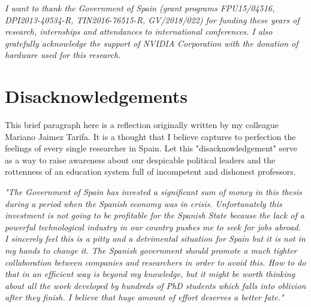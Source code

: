 \vfill

\emph{I want to thank the Government of Spain (grant programs FPU15/04516, DPI2013-40534-R, TIN2016-76515-R, GV/2018/022) for funding these years of research, internships and attendances to international conferences. I also gratefully acknowledge the support of NVIDIA Corporation with the donation of hardware used for this research.}\\

\chapter{Disacknowledgements}

This brief paragraph here is a reflection originally written by my colleague Mariano Jaimez Tarifa. It is a thought that I believe captures to perfection the feelings of every single researcher in Spain. Let this "disacknowledgement" serve as a way to raise awareness about our despicable political leaders and the rottenness of an education system full of incompetent and dishonest professors.

\emph{"The Government of Spain has invested a significant sum of money in this thesis during a period when the Spanish economy was in crisis. Unfortunately this investment is not going to be profitable for the Spanish State because the lack of a powerful technological industry in our country pushes me to seek for jobs abroad. I sincerely feel this is a pitty and a detrimental situation for Spain but it is not in my hands to change it. The Spanish government should promote a much tighter collaboration between companies and researchers in order to avoid this. How to do that in an efficient way is beyond my knowledge, but it might be worth thinking about all the work developed by hundreds of PhD students which falls into oblivion after they finish. I believe that huge amount of effort deserves a better fate."}


